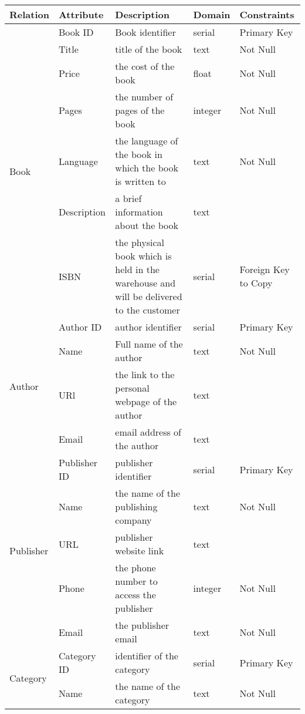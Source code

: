 \begin{longtable}{|p{}|p{} |p{}|p{}|p{} |} 
\hline
\textbf{Relation} & \textbf{Attribute} & \textbf{Description} & \textbf{Domain} & \textbf{Constraints} \\\hline


\multirow{7}{*}{Book} 
& Book ID & Book identifier & serial  & Primary Key \\\cline{2-5}
& Title &title of the book &text  & Not Null\\\cline{2-5}
& Price & the cost of the book &float& Not Null\\\cline{2-5}
& Pages& the number of pages of the book &integer & Not Null \\\cline{2-5}
& Language&the language of the book in which the book is written to &text & Not Null\\\cline{2-5}
& Description &a brief information about the book & text & \\\cline{2-5}
& ISBN &the physical book which is held in the warehouse and will be delivered to the customer & serial & Foreign Key to Copy\\\hline

\multirow{4}{*}{Author} & Author
ID & author identifier &serial & Primary Key\\\cline{2-5}
& Name &Full name of the author &text & Not Null\\\cline{2-5}
& URl & the link to the personal webpage of the author &text& \\\cline{2-5}
& Email & email address of the author &text & \\\hline


\multirow{5}{*}{Publisher} & Publisher ID
&publisher identifier &serial & Primary Key \\\cline{2-5}
& Name & the name of the publishing company &text  &Not Null \\\cline{2-5}
& URL & publisher website link &text  & \\\cline{2-5}
& Phone & the phone number to access the publisher &integer &Not Null \\\cline{2-5}
& Email &the publisher email &text &Not Null \\\hline


\multirow{2}{*}{Category} & Category ID & identifier of the category &serial & Primary Key\\\cline{2-5}
& Name & the name of the category &text & Not Null \\\hline



\end{longtable}
